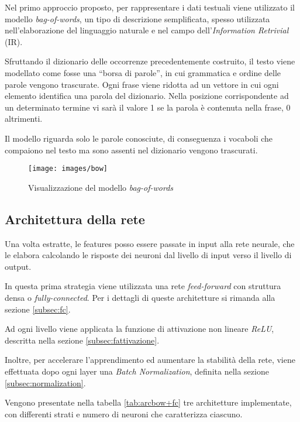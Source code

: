Nel primo approccio proposto, per rappresentare i dati testuali viene utilizzato il modello \emph{bag-of-words}, un tipo di descrizione semplificata, spesso utilizzata nell'elaborazione del linguaggio naturale e nel campo dell'\emph{Information Retrivial} (IR). 

Sfruttando il dizionario delle occorrenze precedentemente costruito, il testo viene modellato  come fosse una ``borsa di parole'', in cui grammatica e ordine delle parole vengono trascurate.
Ogni frase viene ridotta ad un vettore in cui ogni elemento identifica una parola del dizionario. Nella posizione corrispondente ad un determinato termine vi sarà il valore \num{1} se la parola è contenuta nella frase, \num{0} altrimenti.

Il modello riguarda solo le parole conosciute, di conseguenza i vocaboli che compaiono nel testo ma sono assenti nel dizionario vengono trascurati.

\begin{figure}[H]
	\centering
	{\texttt{[image: images/bow]}}
	\caption{Visualizzazione del modello \emph{bag-of-words}}
	\label{fig:bow}
\end{figure}

\subsection{Architettura della rete}
\label{subsec:modelli1}

Una volta estratte, le features posso essere passate in input alla rete neurale, che le elabora calcolando le risposte dei neuroni dal livello di input verso il livello di output.

In questa prima strategia viene utilizzata una rete \emph{feed-forward} con struttura densa o \emph{fully-connected}. Per i dettagli di queste architetture si rimanda alla sezione \ref{subsec:fc}.

Ad ogni livello viene applicata la funzione di attivazione non lineare \emph{ReLU}, descritta nella sezione \ref{subsec:fattivazione}.

Inoltre, per accelerare l'apprendimento ed aumentare la stabilità della rete, viene effettuata dopo ogni layer una \emph{Batch Normalization}, definita nella sezione \ref{subsec:normalization}. 

Vengono presentate nella tabella \ref{tab:arcbow+fc} tre architetture implementate, con differenti strati e numero di neuroni che caratterizza ciascuno.


